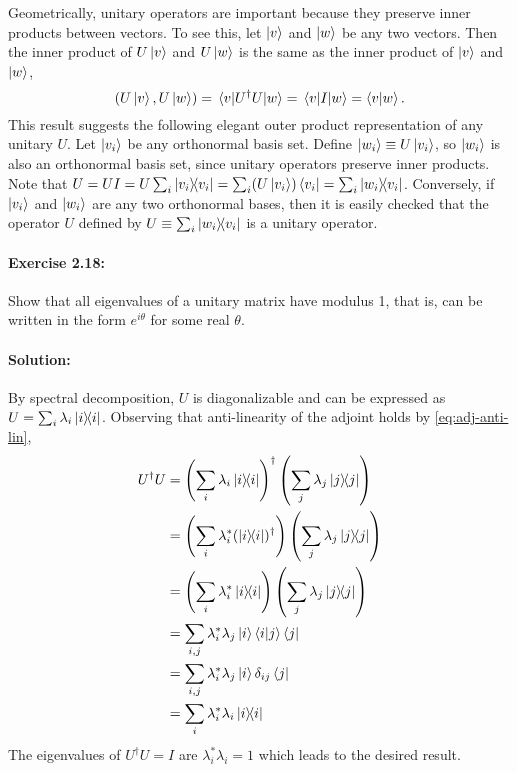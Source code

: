 \documentclass{article}
\begin{document}
Geometrically, unitary operators are important because they preserve inner
products between vectors. To see this, let $\ket{v}$ and $\ket{w}$ be any two
vectors. Then the inner product of $U\ket{v}$ and $U\ket{w}$ is the same as the
inner product of $\ket{v}$ and $\ket{w}$, \begin{equation*}
  (U\ket{v}, U\ket{w}) = \mel{v}{U^\dagger U}{w} = \mel{v}{I}{w} =
    \braket{v}{w}.
\end{equation*} This result suggests the following elegant outer product
representation of any unitary $U$. Let $\ket{v_i}$ be any orthonormal basis
set. Define $\ket{w_i} \equiv U\ket{v_i}$, so $\ket{w_i}$ is also an
orthonormal basis set, since unitary operators preserve inner products. Note
that $U = UI = U\sum_i \ketbra{v_i}{v_i} = \sum_i (U\ket{v_i})\bra{v_i} =
\sum_i \ketbra{w_i}{v_i}$. Conversely, if $\ket{v_i}$ and $\ket{w_i}$ are any
two orthonormal bases, then it is easily checked that the operator $U$ defined
by $U \equiv \sum_i \ketbra{w_i}{v_i}$ is a unitary operator.

\paragraph{\cite{mikeandike} Exercise 2.18:} Show that all eigenvalues of a
unitary matrix have modulus 1, that is, can be written in the form
$e^{i\theta}$ for some real $\theta$.

\paragraph{Solution:} By spectral decomposition, $U$ is diagonalizable and can
be expressed as $U = \sum_i \lambda_i \ketbra{i}{i}$. Observing that
anti-linearity of the adjoint holds by \eqref{eq:adj-anti-lin}, \begin{align*}
  U^\dagger U
    &= \left(\sum_i \lambda_i \ketbra{i}{i}\right)^\dagger \left(\sum_j
      \lambda_j \ketbra{j}{j}\right) \\
    &= \left(\sum_i \lambda_i^* (\ketbra{i}{i})^\dagger\right) \left(\sum_j
      \lambda_j \ketbra{j}{j}\right) \\
    &= \left(\sum_i \lambda_i^*\ketbra{i}{i}\right) \left(\sum_j \lambda_j
      \ketbra{j}{j}\right) \\
    &= \sum_{i,j} \lambda_i^*\lambda_j\ket{i}\braket{i}{j}\bra{j} \\
    &= \sum_{i,j} \lambda_i^*\lambda_j\ket{i}\delta_{ij}\bra{j} \\
    &= \sum_i \lambda_i^*\lambda_i\ketbra{i}{i}
\end{align*}
The eigenvalues of $U^\dagger U = I$ are $\lambda_i^*\lambda_i = 1$ which leads
to the desired result.
\end{document}
